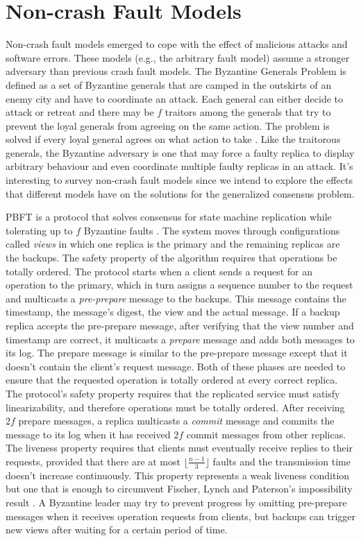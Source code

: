 \section{Non-crash Fault Models} \label{Non-Crash}
Non-crash fault models emerged to cope with the effect of malicious attacks and software errors. These models (e.g., the arbitrary fault model) assume a stronger adversary than previous crash fault models. The Byzantine Generals Problem is defined as a set of Byzantine generals that are camped in the outskirts of an enemy city and have to coordinate an attack. Each general can either decide to attack or retreat and there may be $f$ traitors among the generals that try to prevent the loyal generals from agreeing on the same action. The problem is solved if every loyal general agrees on what action to take \cite{Lamport1982}. Like the traitorous generals, the Byzantine adversary is one that may force a faulty replica to display arbitrary behaviour and even coordinate multiple faulty replicas in an attack. It's interesting to survey non-crash fault models since we intend to explore the effects that different models have on the solutions for the generalized consensus problem. \par
PBFT is a protocol that solves consensus for state machine replication while tolerating up to $f$ Byzantine faults \cite{Castro1999}. The system moves through configurations called \textit{views} in which one replica is the primary and the remaining replicas are the backups. The safety property of the algorithm requires that operations be totally ordered. The protocol starts when a client sends a request for an operation to the primary, which in turn assigns a sequence number to the request and multicasts a \textit{pre-prepare} message to the backups. This message contains the timestamp, the message's digest, the view and the actual message. If a backup replica accepts the pre-prepare message, after verifying that the view number and timestamp are correct, it multicasts a \textit{prepare} message and adds both messages to its log. The prepare message is similar to the pre-prepare message except that it doesn't contain the client's request message. Both of these phases are needed to ensure that the requested operation is totally ordered at every correct replica. The protocol's safety property requires that the replicated service must satisfy linearizability, and therefore operations must be totally ordered. After receiving $2f$ prepare messages, a replica multicasts a \textit{commit} message and commits the message to its log when it has received $2f$ commit messages from other replicas. The liveness property requires that clients must eventually receive replies to their requests, provided that there are at most $\lfloor\frac{n-1}{3}\rfloor$ faults and the transmission time doesn't increase continuously. This property represents a weak liveness condition but one that is enough to circumvent Fischer, Lynch and Paterson's impossibility result \cite{Fischer1985}. A Byzantine leader may try to prevent progress by omitting pre-prepare messages when it receives operation requests from clients, but backups can trigger new views after waiting for a certain period of time. \par
